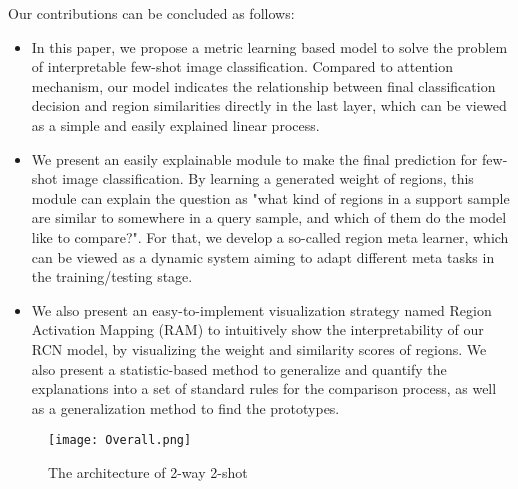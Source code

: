 \documentclass[letterpaper]{article}
\begin{document}
Our contributions can be concluded as follows:
\begin{itemize}
    \item In this paper, we propose a metric learning based model to solve the problem of interpretable few-shot image classification. Compared to attention mechanism, our model indicates the relationship between final classification decision and region similarities directly in the last layer, which can be viewed as a simple and easily explained linear process.  
    \item We present an easily explainable module to make the final prediction for few-shot image classification. By learning a generated weight of regions, this module can explain the question as "what kind of regions in a support sample are similar to somewhere in a query sample, and which of them do the model like to compare?". For that, we develop a so-called region meta learner, which can be viewed as a dynamic system aiming to adapt different meta tasks in the training/testing stage. \item We also present an easy-to-implement visualization strategy named Region Activation Mapping (RAM) to intuitively show the interpretability of our RCN model, by visualizing the weight and similarity scores of regions. We also present a statistic-based method to generalize and quantify the explanations into a set of standard rules for the comparison process, as well as a generalization method to find the prototypes.
\end{itemize}
\begin{figure}
  \texttt{[image: Overall.png]}
  \caption{The architecture of 2-way 2-shot}
  \label{fig:Overall}
\end{figure}
\end{document}
